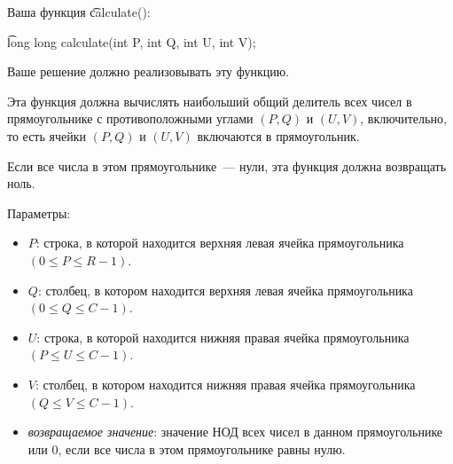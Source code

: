     
Ваша функция \t{calculate()}:

\t{long long calculate(int P, int Q, int U, int V);}

Ваше решение должно реализовывать эту функцию.

Эта функция должна вычислять наибольший общий делитель всех чисел в прямоугольнике с противоположными углами $(P, Q)$ и $(U, V)$, включительно, то есть ячейки $(P, Q)$ и $(U, V)$ включаются в прямоугольник.

Если все числа в этом прямоугольнике~--- нули, эта функция должна возвращать ноль.

Параметры:
\begin{itemize}
\item $P$: строка, в которой находится верхняя левая ячейка прямоугольника $( 0 \leq P \leq R - 1)$.
\item $Q$: столбец, в котором находится верхняя левая ячейка прямоугольника $( 0 \leq Q \leq C - 1)$.
\item $U$: строка, в которой находится нижняя правая ячейка прямоугольника $( P \leq U \leq C - 1)$.
\item $V$: столбец, в котором находится нижняя правая ячейка прямоугольника $( Q \leq V \leq C - 1)$.
\item \textit{возвращаемое значение}: значение НОД всех чисел в данном прямоугольнике или $0$, если все числа в этом прямоугольнике равны нулю.
\end{itemize}
